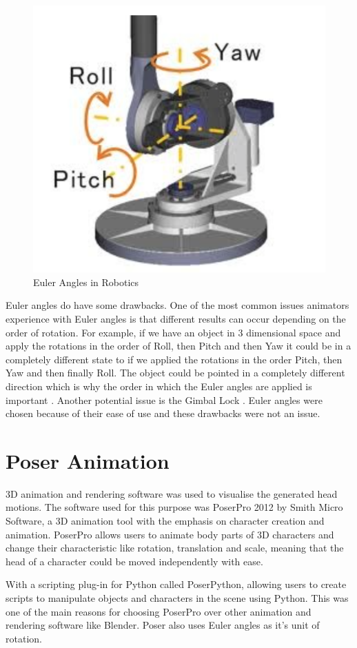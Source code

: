 \documentclass[bsc,frontabs,twoside,singlespacing,parskip,deptreport]{infthesis}
\begin{document}
\begin{figure}[h!]
	\centering
	\includegraphics[width=.5\textwidth]{euler_angles.png}
	\caption{Euler Angles in Robotics \cite{image_gimbal}}
\end{figure}

Euler angles do have some drawbacks. One of the most common issues animators experience with Euler angles is that different results can occur depending on the order of rotation. For example, if we have an object in 3 dimensional space and apply the rotations in the order of Roll, then Pitch and then Yaw it could be in a completely different state to if we applied the rotations in the order Pitch, then Yaw and then finally Roll. The object could be pointed in a completely different direction  which is why the order in which the Euler angles are applied is important \cite{quartionions}. Another potential issue is the Gimbal Lock \cite{gimbal}. Euler angles were chosen because of their ease of use and these drawbacks were not an issue.

\section{Poser Animation}

3D animation and rendering software was used to visualise the generated head motions. The software used for this purpose was PoserPro 2012 by Smith Micro Software, a 3D animation tool with the emphasis on character creation and animation. PoserPro allows users to animate body parts of 3D characters and change their characteristic like rotation, translation and scale, meaning that the head of a character could be moved independently with ease.

With a scripting plug-in for Python called PoserPython, \cite{poser_python} allowing users to create scripts to manipulate objects and characters in the scene using Python. This was one of the main reasons for choosing PoserPro over other animation and rendering software like Blender. Poser also uses Euler angles as it's unit of rotation.
\end{document}
